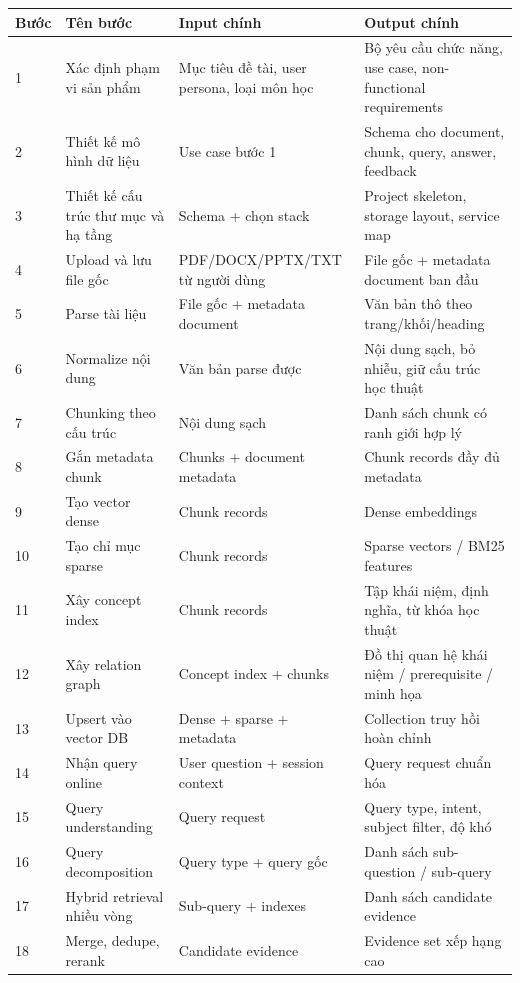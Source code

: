 \documentclass[12pt,a4paper]{article}
\begin{document}
\begin{longtable}{p{}p{}p{}p{}}
\toprule
\textbf{Bước} & \textbf{Tên bước} & \textbf{Input chính} & \textbf{Output chính} \\
\midrule
\endhead
1 & Xác định phạm vi sản phẩm & Mục tiêu đề tài, user persona, loại môn học & Bộ yêu cầu chức năng, use case, non-functional requirements \\
2 & Thiết kế mô hình dữ liệu & Use case bước 1 & Schema cho document, chunk, query, answer, feedback \\
3 & Thiết kế cấu trúc thư mục và hạ tầng & Schema + chọn stack & Project skeleton, storage layout, service map \\
4 & Upload và lưu file gốc & PDF/DOCX/PPTX/TXT từ người dùng & File gốc + metadata document ban đầu \\
5 & Parse tài liệu & File gốc + metadata document & Văn bản thô theo trang/khối/heading \\
6 & Normalize nội dung & Văn bản parse được & Nội dung sạch, bỏ nhiễu, giữ cấu trúc học thuật \\
7 & Chunking theo cấu trúc & Nội dung sạch & Danh sách chunk có ranh giới hợp lý \\
8 & Gắn metadata chunk & Chunks + document metadata & Chunk records đầy đủ metadata \\
9 & Tạo vector dense & Chunk records & Dense embeddings \\
10 & Tạo chỉ mục sparse & Chunk records & Sparse vectors / BM25 features \\
11 & Xây concept index & Chunk records & Tập khái niệm, định nghĩa, từ khóa học thuật \\
12 & Xây relation graph & Concept index + chunks & Đồ thị quan hệ khái niệm / prerequisite / minh họa \\
13 & Upsert vào vector DB & Dense + sparse + metadata & Collection truy hồi hoàn chỉnh \\
14 & Nhận query online & User question + session context & Query request chuẩn hóa \\
15 & Query understanding & Query request & Query type, intent, subject filter, độ khó \\
16 & Query decomposition & Query type + query gốc & Danh sách sub-question / sub-query \\
17 & Hybrid retrieval nhiều vòng & Sub-query + indexes & Danh sách candidate evidence \\
18 & Merge, dedupe, rerank & Candidate evidence & Evidence set xếp hạng cao \\

\end{longtable}
\end{document}
